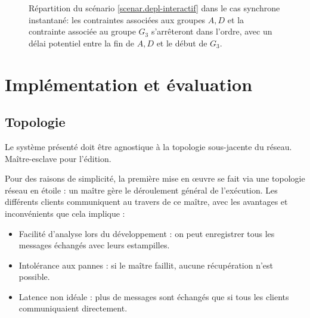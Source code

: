 \documentclass{article}
\begin{document}
\begin{figure}[h]
	\centering
		\caption{Répartition du scénario \ref{scenar.depl-interactif} dans le cas synchrone instantané: les contraintes associées aux groupes $A,D$ et la contrainte associée au groupe $G_3$ s'arrêteront dans l'ordre, avec un délai potentiel entre la fin de $A,D$ et le début de $G_3$.}
\end{figure}




\section{Implémentation et évaluation}\label{sec.evaluation}

\subsection{Topologie}
Le système présenté doit être agnostique à la topologie sous-jacente du réseau.
Maître-esclave pour l'édition.

Pour des raisons de simplicité, la première mise en œuvre se fait via une topologie réseau en étoile : un maître gère le déroulement général de l'exécution. 
Les différents clients communiquent au travers de ce maître, avec les avantages et inconvénients que cela implique : 
\begin{itemize}
    \item Facilité d'analyse lors du développement : on peut enregistrer tous les messages échangés avec leurs estampilles.
    \item Intolérance aux pannes : si le maître faillit, aucune récupération n'est possible.
    \item Latence non idéale : plus de messages sont échangés que si tous les clients communiquaient directement.
\end{itemize}
\end{document}
